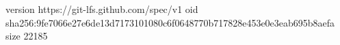 version https://git-lfs.github.com/spec/v1
oid sha256:9fe7066e27e6de13d7173101080c6f0648770b717828e453e0e3eab695b8aefa
size 22185
